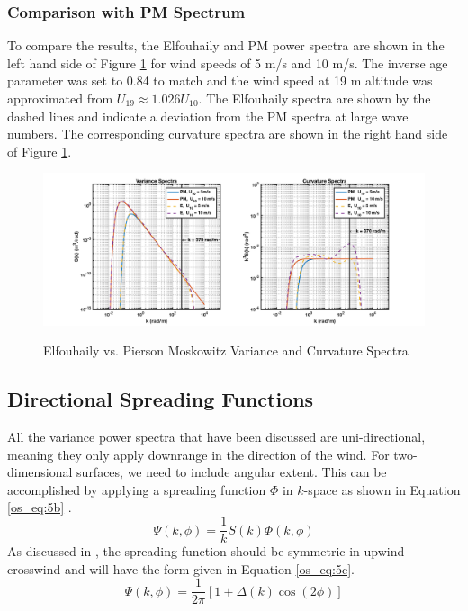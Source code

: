 \subsubsection{Comparison with PM Spectrum}
To compare the results, the Elfouhaily and PM power spectra are shown in the left hand side of Figure \ref{os_fig:2} for wind speeds of 5 m/s and 10 m/s. The inverse age parameter was set to 0.84 to match and the wind speed at 19 m altitude was approximated from $U_{19} \approx 1.026 U_{10}$. The Elfouhaily spectra are shown by the dashed lines and indicate a deviation from the PM spectra at large wave numbers. The corresponding curvature spectra are shown in the right hand side of Figure \ref{os_fig:2}. 
\begin{figure}[H]
  \begin{center}
\includegraphics[width=6in]{../media/Ocean_Surface/elf_vs_PM_variance_curvature_spectrum.png}
  \end{center}
  \renewcommand{\baselinestretch}{1} \small\normalsize
  \begin{quote}
    \caption[Elfouhaily vs. Pierson Moskowitz Variance and Curvature Spectra]{Elfouhaily vs. Pierson Moskowitz Variance and Curvature Spectra\label{os_fig:2}}
  \end{quote}
\end{figure}
\renewcommand{\baselinestretch}{2} \small\normalsize

\subsection{Directional Spreading Functions}
All the variance power spectra that have been discussed are uni-directional, meaning they only apply downrange in the direction of the wind. For two-dimensional surfaces, we need to include angular extent. This can be accomplished by applying a spreading function $\Phi$ in $k$-space as shown in Equation \ref{os_eq:5b} \cite{elfouhaily}.
\begin{equation}
\label{os_eq:5b}
\Psi(k,\phi) = \frac{1}{k}S(k)\Phi(k,\phi)
\end{equation}
\renewcommand{\baselinestretch}{2} \small\normalsize
As discussed in \cite{elfouhaily}, the spreading function should be symmetric in upwind-crosswind and will have the form given in Equation \ref{os_eq:5c}.
\begin{equation}
\label{os_eq:5c}
\Psi(k,\phi) = \frac{1}{2\pi}\left[1 + \Delta(k)\cos(2\phi) \right]
\end{equation}
\renewcommand{\baselinestretch}{2} \small\normalsize

